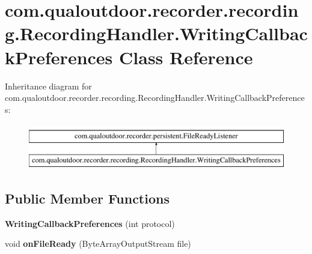 \hypertarget{classcom_1_1qualoutdoor_1_1recorder_1_1recording_1_1RecordingHandler_1_1WritingCallbackPreferences}{\section{com.\-qualoutdoor.\-recorder.\-recording.\-Recording\-Handler.\-Writing\-Callback\-Preferences Class Reference}
\label{classcom_1_1qualoutdoor_1_1recorder_1_1recording_1_1RecordingHandler_1_1WritingCallbackPreferences}
}
Inheritance diagram for com.\-qualoutdoor.\-recorder.\-recording.\-Recording\-Handler.\-Writing\-Callback\-Preferences\-:\begin{figure}[H]
\begin{center}
\leavevmode
\includegraphics[height=2.000000cm]{classcom_1_1qualoutdoor_1_1recorder_1_1recording_1_1RecordingHandler_1_1WritingCallbackPreferences}
\end{center}
\end{figure}
\subsection*{Public Member Functions}
\begin{DoxyCompactItemize}
\item 
\hypertarget{classcom_1_1qualoutdoor_1_1recorder_1_1recording_1_1RecordingHandler_1_1WritingCallbackPreferences_a0e4b9d08354658d50d2b919673ef2b38}{{\bfseries Writing\-Callback\-Preferences} (int protocol)}\label{classcom_1_1qualoutdoor_1_1recorder_1_1recording_1_1RecordingHandler_1_1WritingCallbackPreferences_a0e4b9d08354658d50d2b919673ef2b38}

\item 
\hypertarget{classcom_1_1qualoutdoor_1_1recorder_1_1recording_1_1RecordingHandler_1_1WritingCallbackPreferences_a1807d9dc686d39750275fa5d84bebbf0}{void {\bfseries on\-File\-Ready} (Byte\-Array\-Output\-Stream file)}\label{classcom_1_1qualoutdoor_1_1recorder_1_1recording_1_1RecordingHandler_1_1WritingCallbackPreferences_a1807d9dc686d39750275fa5d84bebbf0}

\end{DoxyCompactItemize}
